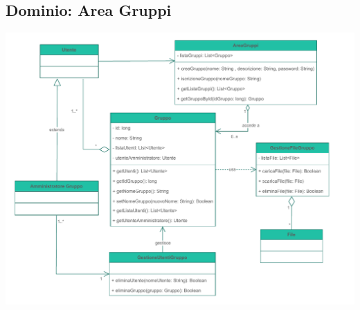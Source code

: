 \subsection*{Dominio: Area Gruppi}
{}
\vspace{0.5cm}
\begin{adjustwidth}{-2cm}{0cm}
\includegraphics[scale=0.8]{progettazione/Progettazione-Area Gruppi.drawio.pdf}
\end{adjustwidth}
\vspace{1cm}



